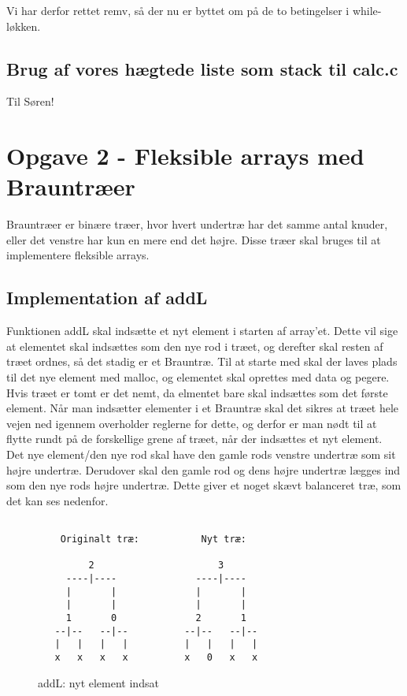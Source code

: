 \documentclass[10pt,a4paper,danish]{article}
\begin{document}
Vi har derfor rettet remv, så der nu er byttet om på de to betingelser i while-løkken.

\subsection{Brug af vores hægtede liste som stack til calc.c}
Til Søren!

\section{Opgave 2 - Fleksible arrays med Brauntræer}
Brauntræer er binære træer, hvor hvert undertræ har det samme antal knuder, eller det venstre har kun en mere end det højre. Disse træer skal bruges til at implementere fleksible arrays.

\subsection{Implementation af addL}
Funktionen addL skal indsætte et nyt element i starten af array'et. Dette vil sige at elementet skal indsættes som den nye rod i træet, og derefter skal resten af træet ordnes, så det stadig er et Brauntræ. Til at starte med skal der laves plads til det nye element med malloc, og elementet skal oprettes med data og pegere. Hvis træet er tomt er det nemt, da elmentet bare skal indsættes som det første element. Når man indsætter elementer i et Brauntræ skal det sikres at træet hele vejen ned igennem overholder reglerne for dette, og derfor er man nødt til at flytte rundt på de forskellige grene af træet, når der indsættes et nyt element. Det nye element/den nye rod skal have den gamle rods venstre undertræ som sit højre undertræ. Derudover skal den gamle rod og dens højre undertræ lægges ind som den nye rods højre undertræ. Dette giver et noget skævt balanceret træ, som det kan ses nedenfor.

\begin{figure}[tb!]
  \centering
  \begin{center}
\begin{verbatim}

    Originalt træ:           Nyt træ:

         2                      3
     ----|----              ----|----
     |       |              |       |
     |       |              |       |
     1       0              2       1
   --|--   --|--          --|--   --|--
   |   |   |   |          |   |   |   |
   x   x   x   x          x   0   x   x

\end{verbatim}
  \end{center}
  \caption{addL: nyt element indsat}
  \label{fig:addl}
\end{figure}
\end{document}

